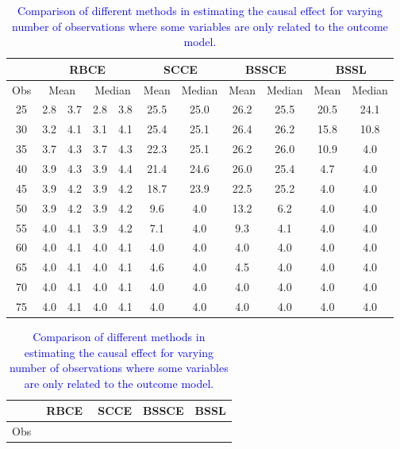 \documentclass[preprint,12pt]{elsarticle}
\newcommand{\added}[1]{\textcolor{blue}{#1}}
\begin{document}
\begin{table}[ht]
	\tiny
	\centering
	\caption{\added{Comparison of different methods in estimating the causal effect for varying number of observations where some variables are only related to the outcome model.}}
	\label{tab:causal1b}
	\begin{tabular}{c|cccc|cc|cc|cc}
		\hline
		\multicolumn{1}{c|}{}&
		\multicolumn{4}{c|}{RBCE}&
		\multicolumn{2}{c|}{SCCE}&
		\multicolumn{2}{c|}{BSSCE}&
		\multicolumn{2}{c}{BSSL}\\
		\hline
		\multicolumn{1}{c|}{Obs}&
		\multicolumn{2}{c}{Mean}&
		\multicolumn{2}{c|}{Median}&
		\multicolumn{1}{c}{Mean}&
		\multicolumn{1}{c|}{Median}&
		\multicolumn{1}{c}{Mean}&
		\multicolumn{1}{c|}{Median}&
		\multicolumn{1}{c}{Mean}&
		\multicolumn{1}{c}{Median}\\
		\hline
		25 & 2.8 & 3.7 & 2.8 & 3.8 & 25.5 & 25.0 & 26.2 & 25.5 & 20.5 & 24.1 \\ 
		30 & 3.2 & 4.1 & 3.1 & 4.1 & 25.4 & 25.1 & 26.4 & 26.2 & 15.8 & 10.8 \\ 
		35 & 3.7 & 4.3 & 3.7 & 4.3 & 22.3 & 25.1 & 26.2 & 26.0 & 10.9 & 4.0 \\ 
		40 & 3.9 & 4.3 & 3.9 & 4.4 & 21.4 & 24.6 & 26.0 & 25.4 & 4.7 & 4.0 \\ 
		45 & 3.9 & 4.2 & 3.9 & 4.2 & 18.7 & 23.9 & 22.5 & 25.2 & 4.0 & 4.0 \\ 
		50 & 3.9 & 4.2 & 3.9 & 4.2 & 9.6 & 4.0 & 13.2 & 6.2 & 4.0 & 4.0 \\ 
		55 & 4.0 & 4.1 & 3.9 & 4.2 & 7.1 & 4.0 & 9.3 & 4.1 & 4.0 & 4.0 \\ 
		60 & 4.0 & 4.1 & 4.0 & 4.1 & 4.0 & 4.0 & 4.0 & 4.0 & 4.0 & 4.0 \\ 
		65 & 4.0 & 4.1 & 4.0 & 4.1 & 4.6 & 4.0 & 4.5 & 4.0 & 4.0 & 4.0 \\ 
		70 & 4.0 & 4.1 & 4.0 & 4.1 & 4.0 & 4.0 & 4.0 & 4.0 & 4.0 & 4.0 \\ 
		75 & 4.0 & 4.1 & 4.0 & 4.1 & 4.0 & 4.0 & 4.0 & 4.0 & 4.0 & 4.0 \\ 
		\hline
	\end{tabular}
	\begin{tabular}{c|rrrrr|rrr|rrr|rrr}
		\hline
		\multicolumn{1}{c|}{}&
		\multicolumn{5}{c|}{RBCE}&
		\multicolumn{3}{c|}{SCCE}&
		\multicolumn{3}{c|}{BSSCE}&
		\multicolumn{3}{c}{BSSL}\\
		\hline
		\multicolumn{1}{c|}{Obs}&

\end{tabular}
\end{table}
\end{document}
